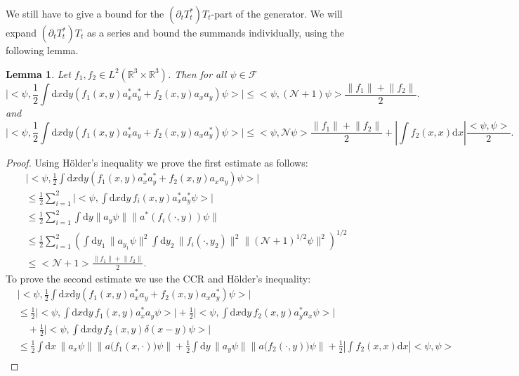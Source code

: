 \documentclass[11pt,a4paper,draft,DIV11]{scrartcl}	%
\newtheorem{lem}[thm]{Lemma}
\newcommand{\fock}{\mathcal{F}}		%
\newcommand{\di}{\textrm{d}}		%
\newcommand{\Ncal}{\mathcal{N}}		%
\newcommand{\scal}[2]{\big<#1,#2\big>} %
\newcommand{\Rbb}{\mathbb{R}}		%
\newcommand{\norm}[1]{\lVert#1\rVert}	%
\newcommand{\ev}[1]{\big<#1\big>}	%
\begin{document}
We still have to give a bound for the $(\partial_t T^*_t)T_t$-part of the generator. We will expand $(\partial_t T^*_t)T_t$ as a series and bound the summands individually, using the following lemma.
\begin{lem}
\label{lm:Bbound}
Let $f_1, f_2 \in L^2(\Rbb^3\times \Rbb^3)$. Then for all $\psi \in \fock$
 \[
\lvert \scal{\psi}{\frac{1}{2} \int \di x\di y \left( f_1(x,y) a^\ast_x a^\ast_y + f_2(x,y) a_x a_y \right) \psi} \rvert \leq \scal{\psi}{(\Ncal+1)\psi} \frac{\norm{f_1}+\norm{f_2}}{2}.
\]
and
\[
 \lvert \scal{\psi}{\frac{1}{2} \int \di x\di y \left( f_1(x,y) a^\ast_x
a_y + f_2(x,y) a_x a^\ast_y \right)  \psi} \rvert
 \leq \scal{\psi}{\Ncal\psi} \frac{\norm{f_1}+\norm{f_2}}{2} + \left\lvert \int f_2(x,x) \di x \right\rvert \frac{\scal{\psi}{\psi}}{2}.
\]
\end{lem}
\begin{proof} Using H\"older's inequality we prove the first estimate as follows:
 \begin{align*}
  & \lvert \scal{\psi}{\frac{1}{2} \int \di x\di y \left( f_1(x,y) a^\ast_x a^\ast_y + f_2(x,y) a_x a_y \right) \psi} \rvert \\
& \leq \frac{1}{2} \sum_{i=1}^2 \lvert \scal{\psi}{\int \di x\di y\, f_i(x,y) a^\ast_x a^\ast_y \psi }\rvert \\
& \leq \frac{1}{2} \sum_{i=1}^2 \int \di y \norm{a_y \psi} \norm{a^\ast(f_i(\cdot,y))\psi} \\
& \leq \frac{1}{2} \sum_{i=1}^2 \left( \int \di y_1\, \norm{a_{y_1}\psi}^2 \int \di y_2\, \norm{f_i(\cdot,y_2)}^2 \norm{(\Ncal+1)^{1/2} \psi}^2 \right)^{1/2} \\
& \leq \ev{\Ncal+1} \frac{\norm{f_1}+\norm{f_2}}{2}.
 \end{align*}
To prove the second estimate we use the CCR and H\"older's inequality:
 \begin{align*}
& \lvert \scal{\psi}{\frac{1}{2} \int \di x\di y \left( f_1(x,y) a^\ast_x a_y + f_2(x,y) a_x a^\ast_y \right)  \psi} \rvert\\
& \leq \frac{1}{2} \lvert \scal{\psi}{\int \di x\di y\, f_1(x,y) a^\ast_x a_y \psi} \rvert + \frac{1}{2}\lvert \scal{\psi}{\int \di x \di y\, f_2(x,y) a^\ast_y a_x \psi}\rvert \\
&\quad + \frac{1}{2} \lvert \scal{\psi}{\int \di x \di y\, f_2(x,y) \delta(x-y) \psi}\rvert \\
& \leq \frac{1}{2} \int \di x\, \norm{a_x \psi} \norm{a\big(f_1(x,\cdot)\big)\psi} + \frac{1}{2} \int \di y\, \norm{a_y\psi} \norm{a\big(f_2(\cdot,y)\big)\psi} + \frac{1}{2} \left\lvert \int f_2(x,x) \di x \right\rvert \scal{\psi}{\psi} \\

\end{align*}
\end{proof}
\end{document}
